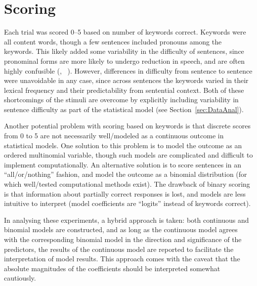 \section{Scoring\label{sec:Scoring}}
Each trial was scored 0–5 based on number of keywords correct.  Keywords were all content words, though a few sentences included pronouns among the keywords.  This likely added some variability in the difficulty of sentences, since pronominal forms are more likely to undergo reduction in speech, and are often highly confusible (\eg,  \vs\ ).  However, differences in difficulty from sentence to sentence were unavoidable in any case, since across sentences the keywords varied in their lexical frequency and their predictability from sentential context.  Both of these shortcomings of the stimuli are overcome by explicitly including variability in sentence difficulty as part of the statistical model (see Section~\ref{sec:DataAnal}).

Another potential problem with scoring based on keywords is that discrete scores from 0 to 5 are not necessarily well\-/modeled as a continuous outcome in statistical models.  One solution to this problem is to model the outcome as an ordered multinomial variable, though such models are complicated and difficult to implement computationally.  An alternative solution is to score sentences in an “all\-/or\-/nothing” fashion, and model the outcome as a binomial distribution (for which well\-/tested computational methods exist).  The drawback of binary scoring is that information about partially correct responses is lost, and models are less intuitive to interpret (model coefficients are “logits” instead of keywords correct).

In analysing these experiments, a hybrid approach is taken: both continuous and binomial models are constructed, and as long as the continuous model agrees with the corresponding binomial model in the direction and significance of the predictors, the results of the continuous model are reported to facilitate the interpretation of model results.  This approach comes with the caveat that the absolute magnitudes of the coefficients should be interpreted somewhat cautiously.


